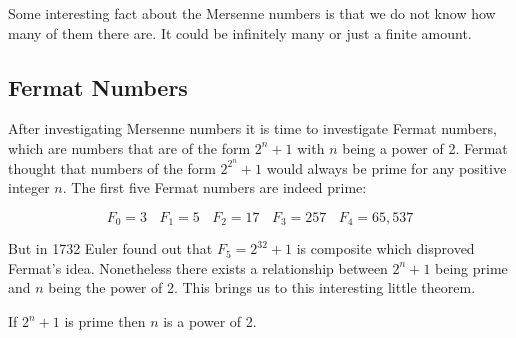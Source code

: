 \documentclass{article}
\theoremstyle{definition}
\begin{document}
Some interesting fact about the Mersenne numbers is that we do not know how many of them there are. It could be infinitely many or just a finite amount.


\subsection{Fermat Numbers}
After investigating Mersenne numbers it is time to investigate Fermat numbers, which are numbers that are of the form $2^n + 1$ with $n$ being a power of 2. Fermat thought that numbers of the form $2^{2^n}+1$ would always be prime for any positive integer $n$. The first five Fermat numbers are indeed prime:

\begin{equation}
    F_0 = 3 \: \:\: \: F_1 = 5 \: \:\: \: F_2 = 17 \: \:\: \: F_3 = 257 \: \:\: \: F_4 = 65,537
\end{equation}

But in 1732 Euler found out that $F_5 = 2^{32}+1$ is composite which disproved Fermat's idea. Nonetheless there exists a relationship between $2^n+1$ being prime and $n$ being the power of 2. This brings us to this interesting little theorem.
\begin{theorem}
    If $2^n + 1$ is prime then $n$ is a power of 2.
\end{theorem}
\end{document}
